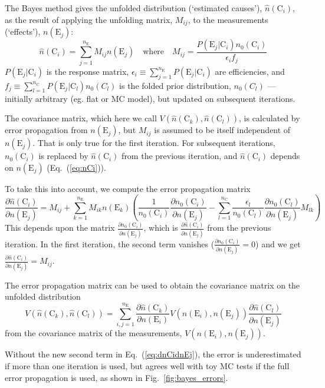 \documentclass{cernrep}
\newcommand{\E}{\mathrm{E}}
\newcommand{\C}{\mathrm{C}}
\newcommand{\dd}[2]{\frac{\partial{#1}}{\partial{#2}}}
\begin{document}
The Bayes method gives the unfolded distribution (`estimated causes'), $\hat{n}(\C_i)$,
as the result of applying the unfolding matrix, $M_{ij}$, to the measurements (`effects'), $n(\E_j)$:
\begin{equation}
\hat{n}(\C_i) = \sum_{j=1}^{n_{\E}} M_{ij} n(\E_j)
\quad\mathrm{where}\quad
M_{ij} = \frac{P(\E_j|\C_i) n_0(\C_i)}{\epsilon_i f_j}
\label{eq:nCi}
\end{equation}
\noindent $P(\E_j|\C_i)$ is the response matrix,
$\epsilon_i \equiv \sum_{j=1}^{n_{\E}} P(\E_j|\C_i)$ are efficiencies, and
$f_j \equiv \sum_{l=1}^{n_{\C}} P(\E_j|\C_l) n_0(C_l)$ is the folded
prior distribution, $n_0(C_l)$ --- initially arbitrary (eg. flat or MC model), but updated on
subsequent iterations.

The covariance matrix, which here we call $V(\hat{n}(\C_k),\hat{n}(\C_l))$,
is calculated by error propagation from $n(\E_j)$,
but $M_{ij}$ is assumed to be itself independent of $n(\E_j)$. That is only true for the first iteration.
For subsequent iterations, $n_0(\C_i)$ is replaced by $\hat{n}(\C_i)$ from the
previous iteration, and $\hat{n}(\C_i)$ depends on $n(\E_j)$ (Eq.~(\ref{eq:nCi})).

To take this into account, we compute the error propagation matrix
\begin{equation}
\dd{\hat{n}(\C_i)}{n(\E_j)} = M_{ij} + \sum_{k=1}^{n_{\E}} M_{ik} n(\E_k)
\left( \frac{1}{n_0(\C_i)} \dd{n_0(\C_i)}{n(\E_j)} - \sum_{l=1}^{n_{\C}} \frac{\epsilon_l}{n_0(\C_l)} \dd{n_0(\C_l)}{n(\E_j)} M_{lk} \right)
\label{eq:dnCidnEj}
\end{equation}
This depends upon the matrix $\dd{n_0(\C_i)}{n(\E_j)}$, which is $\dd{\hat{n}(\C_i)}{n(\E_j)}$ from the previous iteration.
In the first iteration, the second term vanishes ($\dd{n_0(\C_i)}{n(\E_j)}=0$) and we get $\dd{\hat{n}(\C_i)}{n(\E_j)} = M_{ij}$.

The error propagation matrix can be used to obtain the covariance matrix on the unfolded distribution
\begin{equation}
V(\hat{n}(\C_k),\hat{n}(\C_l)) = \sum_{i,j=1}^{n_{\E}} \dd{\hat{n}(\C_k)}{n(\E_i)} V(n(\E_i),n(\E_j)) \dd{\hat{n}(\C_l)}{n(\E_j)}
\label{eq:Vij}
\end{equation}
\noindent from the covariance matrix of the measurements, $V(n(\E_i),n(\E_j))$.

Without the new second term in Eq.~(\ref{eq:dnCidnEj}),
the error is underestimated if more than one iteration
is used, but agrees well with toy MC tests if the full error propagation is used,
as shown in Fig.~\ref{fig:bayes_errors}.%
\end{document}

